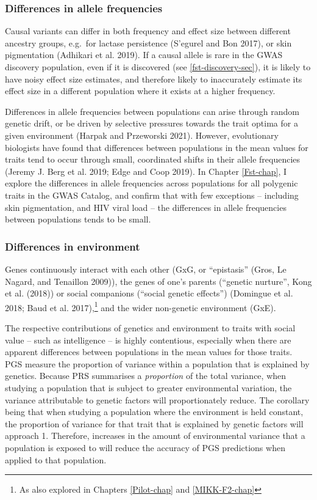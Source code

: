 \documentclass[
]{book}
\begin{document}
\hypertarget{differences-in-allele-frequencies}{%
\subsubsection{Differences in allele frequencies}\label{differences-in-allele-frequencies}}

Causal variants can differ in both frequency and effect size between different ancestry groups, e.g.~for lactase persistence (S'egurel and Bon 2017), or skin pigmentation (Adhikari et al. 2019). If a causal allele is rare in the GWAS discovery population, even if it is discovered (see \ref{fst-discovery-sec}), it is likely to have noisy effect size estimates, and therefore likely to inaccurately estimate its effect size in a different population where it exists at a higher frequency.

Differences in allele frequencies between populations can arise through random genetic drift, or be driven by selective pressures towards the trait optima for a given environment (Harpak and Przeworski 2021). However, evolutionary biologists have found that differences between populations in the mean values for traits tend to occur through small, coordinated shifts in their allele frequencies (Jeremy J. Berg et al. 2019; Edge and Coop 2019). In Chapter \ref{Fst-chap}, I explore the differences in allele frequencies across populations for all polygenic traits in the GWAS Catalog, and confirm that with few exceptions -- including skin pigmentation, and HIV viral load -- the differences in allele frequencies between populations tends to be small.

\hypertarget{fst-env-sec}{%
\subsubsection{Differences in environment}\label{fst-env-sec}}

Genes continuously interact with each other (GxG, or ``epistasis'' (Gros, Le Nagard, and Tenaillon 2009)), the genes of one's parents (``genetic nurture'', Kong et al. (2018)) or social companions (``social genetic effects'') (Domingue et al. 2018; Baud et al. 2017),\footnote{As also explored in Chapters \ref{Pilot-chap} and \ref{MIKK-F2-chap}} and the wider non-genetic environment (GxE).

The respective contributions of genetics and environment to traits with social value -- such as intelligence -- is highly contentious, especially when there are apparent differences between populations in the mean values for those traits. PGS measure the proportion of variance within a population that is explained by genetics. Because PRS summarises a \emph{proportion} of the total variance, when studying a population that is subject to greater environmental variation, the variance attributable to genetic factors will proportionately reduce. The corollary being that when studying a population where the environment is held constant, the proportion of variance for that trait that is explained by genetic factors will approach 1. Therefore, increases in the amount of environmental variance that a population is exposed to will reduce the accuracy of PGS predictions when applied to that population.
\end{document}
